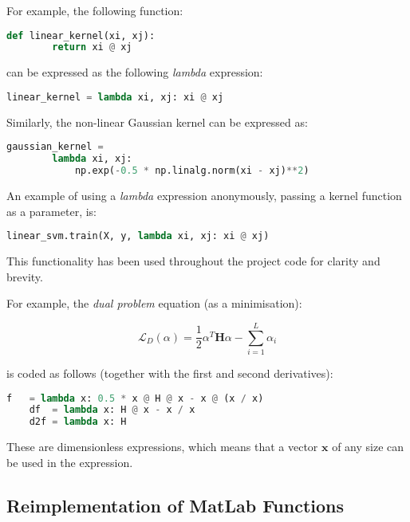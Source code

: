 \documentclass[10pt, a4paper,reqno]{amsart}
\begin{document}
For example, the following function:

\begin{lstlisting}[language=Python]
    def linear_kernel(xi, xj):
        return xi @ xj
\end{lstlisting}

can be expressed as the following \emph{lambda} expression:

\begin{lstlisting}[language=Python]
    linear_kernel = lambda xi, xj: xi @ xj
\end{lstlisting}

Similarly, the non-linear Gaussian kernel can be expressed as:

\begin{lstlisting}[language=Python]
    gaussian_kernel =
        lambda xi, xj:
            np.exp(-0.5 * np.linalg.norm(xi - xj)**2)
\end{lstlisting}

An example of using a \emph{lambda} expression anonymously, passing a kernel function as a parameter, is:

\begin{lstlisting}[language=Python]
    linear_svm.train(X, y, lambda xi, xj: xi @ xj)
\end{lstlisting}

This functionality has been used throughout the project code for clarity and brevity.

For example, the \emph{dual problem} equation (as a minimisation):

\begin{equation}
\mathcal{L}_D(\alpha) = \frac{1}{2}\alpha^T\mathbf{H}\alpha - \sum_{i=1}^{L}\alpha_i
\end{equation}

is coded as follows (together with the first and second derivatives):

\begin{lstlisting}[language=Python]
    f   = lambda x: 0.5 * x @ H @ x - x @ (x / x)
    df  = lambda x: H @ x - x / x
    d2f = lambda x: H 
\end{lstlisting}

These are dimensionless expressions, which means that a vector $\mathbf{x}$ of any size can be used in the expression.

\subsection{Reimplementation of MatLab Functions}
\end{document}
